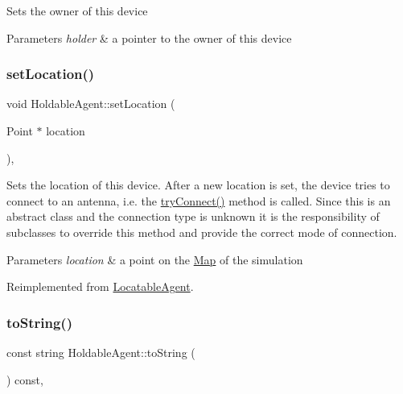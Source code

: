 Sets the owner of this device 
\begin{DoxyParams}{Parameters}
{\em holder} & a pointer to the owner of this device \\
\hline
\end{DoxyParams}
\mbox{\label{class_holdable_agent_aec98d2fe325b48d9a84ad3dad44700e0}} 
\subsubsection{\texorpdfstring{set\+Location()}{setLocation()}}
{\footnotesize\ttfamily void Holdable\+Agent\+::set\+Location (\begin{DoxyParamCaption}\item[{Point $\ast$}]{location }\end{DoxyParamCaption})\hspace{0.3cm}{\ttfamily [override]}, {\ttfamily [virtual]}}

Sets the location of this device. After a new location is set, the device tries to connect to an antenna, i.\+e. the \hyperlink{class_holdable_agent_a0789d757d81b43ee016e9362046f6dea}{try\+Connect()} method is called. Since this is an abstract class and the connection type is unknown it is the responsibility of subclasses to override this method and provide the correct mode of connection. 
\begin{DoxyParams}{Parameters}
{\em location} & a point on the \hyperlink{class_map}{Map} of the simulation \\
\hline
\end{DoxyParams}


Reimplemented from \hyperlink{class_locatable_agent_a754b237c404b77714fedd397f214bc02}{Locatable\+Agent}.

\mbox{\label{class_holdable_agent_a2c581226b8994f24b6b2306ae17dbb52}} 
\subsubsection{\texorpdfstring{to\+String()}{toString()}}
{\footnotesize\ttfamily const string Holdable\+Agent\+::to\+String (\begin{DoxyParamCaption}{ }\end{DoxyParamCaption}) const\hspace{0.3cm}{\ttfamily [override]}, {\ttfamily [virtual]}}


